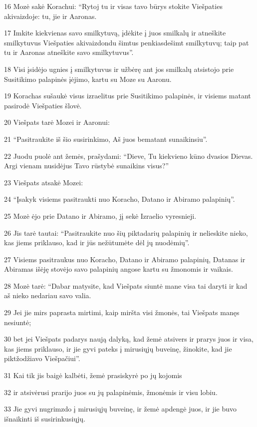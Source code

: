 \par 16 Mozė sakė Korachui: “Rytoj tu ir visas tavo būrys stokite Viešpaties akivaizdoje: tu, jie ir Aaronas. 
\par 17 Imkite kiekvienas savo smilkytuvą, įdėkite į juos smilkalų ir atneškite smilkytuvus Viešpaties akivaizdon­du šimtus penkiasdešimt smilkytuvų; taip pat tu ir Aaronas atneškite savo smilkytuvus”. 
\par 18 Visi įsidėjo ugnies į smilkytuvus ir užbėrę ant jos smilkalų atsistojo prie Susitikimo palapinės įėjimo, kartu su Moze su Aaronu. 
\par 19 Korachas sušaukė visus izraelitus prie Susitikimo palapinės, ir visiems matant pasirodė Viešpaties šlovė. 
\par 20 Viešpats tarė Mozei ir Aaronui: 
\par 21 “Pasitraukite iš šio susirinkimo, Aš juos bematant sunaikinsiu”. 
\par 22 Juodu puolė ant žemės, prašydami: “Dieve, Tu kiekvieno kūno dvasios Dievas. Argi vienam nusidėjus Tavo rūstybė sunaikins visus?” 
\par 23 Viešpats atsakė Mozei: 
\par 24 “Įsakyk visiems pasitraukti nuo Koracho, Datano ir Abiramo palapinių”. 
\par 25 Mozė ėjo prie Datano ir Abiramo, jį sekė Izraelio vyresnieji. 
\par 26 Jis tarė tautai: “Pasitraukite nuo šių piktadarių palapinių ir nelieskite nieko, kas jiems priklauso, kad ir jūs nežūtumėte dėl jų nuodėmių”. 
\par 27 Visiems pasitraukus nuo Koracho, Datano ir Abiramo palapinių, Datanas ir Abiramas išėję stovėjo savo palapinių angose kartu su žmonomis ir vaikais. 
\par 28 Mozė tarė: “Dabar matysite, kad Viešpats siuntė mane visa tai daryti ir kad aš nieko nedariau savo valia. 
\par 29 Jei jie mirs paprasta mirtimi, kaip miršta visi žmonės, tai Viešpats manęs nesiuntė; 
\par 30 bet jei Viešpats padarys naują dalyką, kad žemė atsivers ir prarys juos ir visa, kas jiems priklauso, ir jie gyvi pateks į mirusiųjų buveinę, žinokite, kad jie piktžodžiavo Viešpačiui”. 
\par 31 Kai tik jis baigė kalbėti, žemė prasiskyrė po jų kojomis 
\par 32 ir atsivėrusi prarijo juos su jų palapinėmis, žmonėmis ir visu lobiu. 
\par 33 Jie gyvi nugrimzdo į mirusiųjų buveinę, ir žemė apdengė juos, ir jie buvo išnaikinti iš susirinkusiųjų. 
